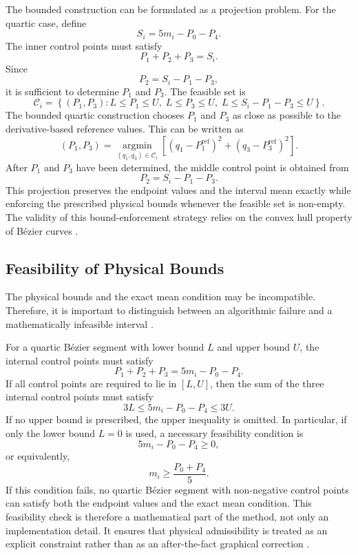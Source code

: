 \documentclass[12pt,a4paper]{article}
\begin{document}
The bounded construction can be formulated as a projection problem. For the quartic case, define
\[
S_i=5m_i-P_0-P_4.
\]
The inner control points must satisfy
\[
P_1+P_2+P_3=S_i.
\]
Since
\[
P_2=S_i-P_1-P_3,
\]
it is sufficient to determine \(P_1\) and \(P_3\). The feasible set is
\[
\mathcal{C}_i=
\left\{(P_1,P_3):
L\leq P_1\leq U,
\;L\leq P_3\leq U,
\;L\leq S_i-P_1-P_3\leq U
\right\}.
\]
The bounded quartic construction chooses \(P_1\) and \(P_3\) as close as possible to the derivative-based reference values. This can be written as
\[
(P_1,P_3)=
\underset{(q_1,q_3)\in\mathcal{C}_i}{\operatorname{argmin}}
\left[
(q_1-P_1^{\mathrm{ref}})^2+(q_3-P_3^{\mathrm{ref}})^2
\right].
\]
After \(P_1\) and \(P_3\) have been determined, the middle control point is obtained from
\[
P_2=S_i-P_1-P_3.
\]
This projection preserves the endpoint values and the interval mean exactly while enforcing the prescribed physical bounds whenever the feasible set is non-empty. The validity of this bound-enforcement strategy relies on the convex hull property of B\'ezier curves \cite{farin2002curves,piegl1997nurbs,aaltoBezier2013}.

\subsection{Feasibility of Physical Bounds}

The physical bounds and the exact mean condition may be incompatible. Therefore, it is important to distinguish between an algorithmic failure and a mathematically infeasible interval \cite{deboor1978splines,fritsch1980monotone}.

For a quartic B\'ezier segment with lower bound \(L\) and upper bound \(U\), the internal control points must satisfy
\[
P_1+P_2+P_3=5m_i-P_0-P_4.
\]
If all control points are required to lie in \([L,U]\), then the sum of the three internal control points must satisfy
\[
3L\leq 5m_i-P_0-P_4\leq 3U.
\]
If no upper bound is prescribed, the upper inequality is omitted. In particular, if only the lower bound \(L=0\) is used, a necessary feasibility condition is
\[
5m_i-P_0-P_4\geq 0,
\]
or equivalently,
\[
m_i\geq \frac{P_0+P_4}{5}.
\]
If this condition fails, no quartic B\'ezier segment with non-negative control points can satisfy both the endpoint values and the exact mean condition. This feasibility check is therefore a mathematical part of the method, not only an implementation detail. It ensures that physical admissibility is treated as an explicit constraint rather than as an after-the-fact graphical correction \cite{farin2002curves,kokhan2013geoinformation}.
\newpage
\end{document}
